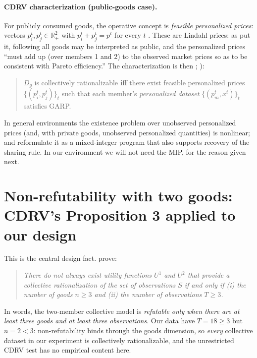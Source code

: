 \documentclass[11pt]{article}
\theoremstyle{remark}
\newcommand{\R}{\mathbb{R}}
\begin{document}
\paragraph{CDRV characterization (public-goods case).}
For publicly consumed goods, the operative concept is \emph{feasible personalized prices}: vectors $p^t_i,p^t_j\in\R^2_+$ with $p^t_i+p^t_j=p^t$ for every $t$ \citep[Def.~3]{cherchye2011}. These are Lindahl prices: as \citet[p.~558]{cherchye2007} put it, following \citet{chiappori1988} all goods may be interpreted as public, and the personalized prices ``must add up (over members 1 and 2) to the observed market prices so as to be consistent with Pareto efficiency.'' The characterization is then \citep[Prop.~1(ii)]{cherchye2007}; \citealp[Prop.~1(ii)]{cherchye2011}):
\begin{quote}
$D_g$ is collectively rationalizable \textbf{iff} there exist feasible personalized prices $\{(p^t_i,p^t_j)\}_t$ such that each member's \emph{personalized dataset} $\{(p^t_m,x^t)\}_t$ satisfies GARP.
\end{quote}
In general environments the existence problem over unobserved personalized prices (and, with private goods, unobserved personalized quantities) is nonlinear; \citet{cherchye2008IP} and \citet[Prop.~2]{cherchye2011} reformulate it as a mixed-integer program that also supports recovery of the sharing rule. In our environment we will not need the MIP, for the reason given next.

\section{Non-refutability with two goods: CDRV's Proposition 3 applied to our design}\label{sec:vacuity}

This is the central design fact. \citet[Prop.~3]{cherchye2007} prove:

\begin{quote}
\emph{There do not always exist utility functions $U^1$ and $U^2$ that provide a collective rationalization of the set of observations $S$ if and only if (i) the number of goods $n\ge 3$ and (ii) the number of observations $T\ge 3$.}
\end{quote}

\noindent In words, the two-member collective model is \emph{refutable only when there are at least three goods and at least three observations}. Our data have $T=18\ge 3$ but $n=2<3$: non-refutability binds through the goods dimension, so \emph{every} collective dataset in our experiment is collectively rationalizable, and the unrestricted CDRV test has no empirical content here.
\end{document}
